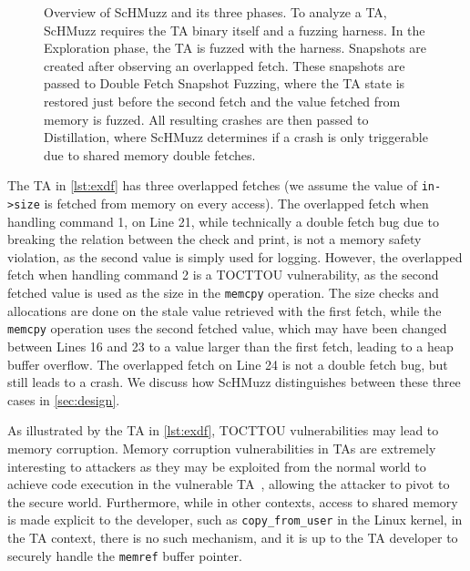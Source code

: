 \documentclass[conference]{IEEEtran}
\newcommand{\sysname}{ScHMuzz\xspace}
\newcommand{\stageone}{Exploration\xspace}
\newcommand{\stagetwo}{Double Fetch Snapshot Fuzzing\xspace}
\newcommand{\stagethree}{Distillation\xspace}
\begin{document}
\begin{figure}[h!]
  \centering
  
  \caption{
    Overview of \sysname and its three phases. To analyze a TA, \sysname requires the TA binary itself and a fuzzing harness. In the \stageone phase, the TA is fuzzed with the harness. Snapshots are created after observing an overlapped fetch. These snapshots are passed to \stagetwo, where the TA state is restored just before the second fetch and the value fetched from memory is fuzzed. All resulting crashes 
    are then passed to \stagethree, where \sysname determines if a crash is only triggerable due to shared memory double fetches.
    }
  \label{fig:overview}
\end{figure}

The TA in \autoref{lst:exdf} has three overlapped fetches (we assume the value of \texttt{in->size} is fetched from memory 
on every access). The overlapped
fetch when handling command 1, on Line 21, while technically a double fetch bug due to breaking the relation 
between the check and print, is not a memory safety violation, as the second value is simply 
used for logging. However, the overlapped fetch when handling command 2 is a TOCTTOU vulnerability, as the 
second fetched value is used as the size in the \texttt{memcpy} operation. The size checks and allocations are done on the 
stale value retrieved with the first fetch, while the \texttt{memcpy} operation uses the second fetched 
value, which may have been changed between Lines 16 and 23 to a value larger than 
the first fetch, leading to a heap buffer overflow. The overlapped fetch on Line 24 is not a 
double fetch bug, but still leads to a crash. We discuss how \sysname distinguishes between 
these three cases in \autoref{sec:design}.

As illustrated by the TA in \autoref{lst:exdf}, TOCTTOU vulnerabilities may lead to memory 
corruption. Memory corruption vulnerabilities in TAs are extremely interesting 
to attackers as they may be exploited from the normal world to achieve code execution 
in the vulnerable TA~\cite{fiasccco,beniaini2017trustissues,berard2018kinibi,busch2020finding,rollback,globalconfusion,Komaromy2021UnboxYourPhone,Li2024DiveIntoAndroidTA,AdamskiGuilbonPeterlin2019SamsungTrustZone,Makkaveev2019TrustZoneFuzzing,AdamTC}, allowing the attacker to pivot to the secure world.
Furthermore, while in other contexts, access to shared memory is made explicit to 
the developer, such as \texttt{copy\_from\_user} in the Linux kernel, in the TA 
context, there is no such mechanism, and it is up to the TA developer to securely  
handle the \texttt{memref} buffer pointer. 
\end{document}
